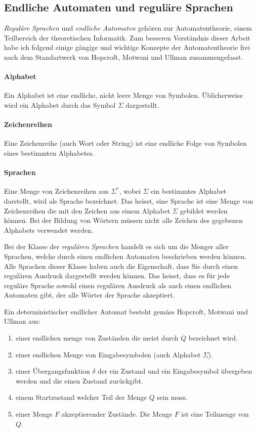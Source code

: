 \subsection{Endliche Automaten und reguläre Sprachen}
\textit{Reguläre Sprachen} und \textit{endliche Automaten} gehören zur Automatentheorie, einem Teilbereich der theoretischen Informatik. Zum besseren Verständnis dieser Arbeit habe ich folgend einige gängige und wichtige Konzepte der Automatentheorie frei nach dem Standartwerk von Hopcroft, Motwani und Ullman zusammengefasst. \cite{hopcroft}
 
\paragraph{Alphabet}
Ein Alphabet ist eine endliche, nicht leere Menge von Symbolen. Üblicherweise wird ein Alphabet durch das Symbol $\Sigma$ dargestellt.
\paragraph{Zeichenreihen}
Eine Zeichenreihe (auch Wort oder String) ist eine endliche Folge von Symbolen eines bestimmten Alphabetes.
\paragraph{Sprachen}
Eine Menge von Zeichenreihen aus $\Sigma^*$, wobei $\Sigma$ ein bestimmtes Alphabet darstellt, wird als Sprache bezeichnet. Das heisst, eine Sprache ist eine Menge von Zeichenreihen die mit den Zeichen aus einem Alphabet $\Sigma$ gebildet werden können. Bei der Bildung von Wörtern müssen nicht alle Zeichen des gegebenen Alphabets verwendet werden.

Bei der Klasse der \textit{regulären Sprachen} handelt es sich um die Menger aller Sprachen, welche durch einen endlichen Automaten beschrieben werden können. Alle Sprachen dieser Klasse haben auch die Eigenschaft, dass Sie durch einen regulären Ausdruck dargestellt werden können. Das heisst, dass es für jede reguläre Sprache sowohl einen regulären Ausdruck als auch einen endlichen Automaten gibt, der alle Wörter der Sprache akzeptiert.

Ein deterministischer endlicher Automat besteht gemäss Hopcroft, Motwani und Ullman \cite{hopcroft} aus:
\begin{enumerate}
  \item einer endlichen menge von Zuständen die meist durch $Q$ bezeichnet wird.
  \item einer endlichen Menge von Eingabesymbolen (auch Alphabet $\Sigma$).
  \item einer Übergangsfunktion $\delta$ der ein Zustand und ein Eingabesymbol übergeben werden und die einen Zustand zurückgibt.
  \item einem Startzustand welcher Teil der Menge $Q$ sein muss.
  \item einer Menge $F$ akzeptierender Zustände. Die Menge $F$ ist eine Teilmenge von $Q$.
\end{enumerate}

